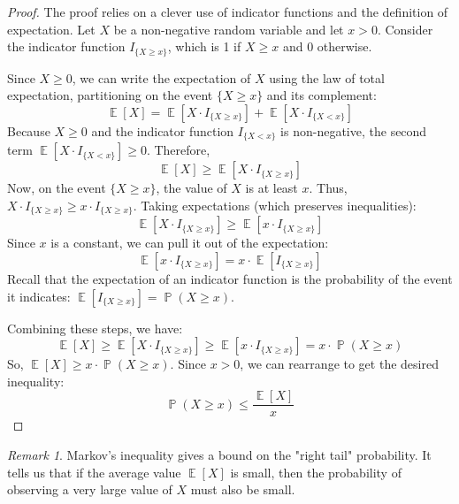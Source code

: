 \documentclass[11pt]{article}
\theoremstyle{definition}
\theoremstyle{remark}
\newtheorem{remark}[theorem]{Remark}
\DeclareMathOperator{\E}{\mathbb{E}} %
\DeclareMathOperator{\Prob}{\mathbb{P}} %
\newcommand{\Indic}{I} %
\begin{document}
\begin{proof}
The proof relies on a clever use of indicator functions and the definition of expectation. Let $X$ be a non-negative random variable and let $x > 0$.
Consider the indicator function $\Indic_{\{X \ge x\}}$, which is 1 if $X \ge x$ and 0 otherwise.

Since $X \ge 0$, we can write the expectation of $X$ using the law of total expectation, partitioning on the event $\{X \ge x\}$ and its complement:
\[
\E[X] = \E[X \cdot \Indic_{\{X \ge x\}}] + \E[X \cdot \Indic_{\{X < x\}}]
\]
Because $X \ge 0$ and the indicator function $\Indic_{\{X < x\}}$ is non-negative, the second term $\E[X \cdot \Indic_{\{X < x\}}] \ge 0$. Therefore,
\[
\E[X] \ge \E[X \cdot \Indic_{\{X \ge x\}}]
\]
Now, on the event $\{X \ge x\}$, the value of $X$ is at least $x$. Thus, $X \cdot \Indic_{\{X \ge x\}} \ge x \cdot \Indic_{\{X \ge x\}}$. Taking expectations (which preserves inequalities):
\[
\E[X \cdot \Indic_{\{X \ge x\}}] \ge \E[x \cdot \Indic_{\{X \ge x\}}]
\]
Since $x$ is a constant, we can pull it out of the expectation:
\[
\E[x \cdot \Indic_{\{X \ge x\}}] = x \cdot \E[\Indic_{\{X \ge x\}}]
\]
Recall that the expectation of an indicator function is the probability of the event it indicates: $\E[\Indic_{\{X \ge x\}}] = \Prob(X \ge x)$.

Combining these steps, we have:
\[
\E[X] \ge \E[X \cdot \Indic_{\{X \ge x\}}] \ge \E[x \cdot \Indic_{\{X \ge x\}}] = x \cdot \Prob(X \ge x)
\]
So, $\E[X] \ge x \cdot \Prob(X \ge x)$. Since $x > 0$, we can rearrange to get the desired inequality:
\[
\Prob(X \ge x) \le \frac{\E[X]}{x}
\]
\end{proof}

\begin{remark}
Markov's inequality gives a bound on the "right tail" probability. It tells us that if the average value $\E[X]$ is small, then the probability of observing a very large value of $X$ must also be small.
\end{remark}
\end{document}
